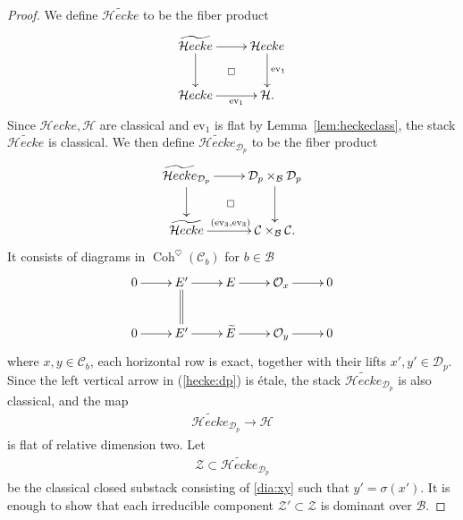 \documentclass[11pt,oneside,a4paper,mathscr]{amsart}
\makeatletter
\theoremstyle{definition}
\newcommand{\cH}{\mathcal{H}}
\newcommand{\cB}{\mathcal{B}}
\newcommand{\cC}{\mathcal{C}}
\newcommand{\cD}{\mathcal{D}}
\newcommand{\ev}{\mathrm{ev}}
\newcommand{\diasquare}{\ar@{}[rd]|\square}
\newcommand{\cHecke}{\mathcal{H}ecke}
\newcommand{\Coh}{\operatorname{Coh}}
\makeatother
\begin{document}
\begin{proof}
    We define $\widetilde{\mathcal{H}ecke}$ to be the fiber product
    \begin{align*}
    \xymatrix{
       \widetilde{\mathcal{H}ecke} \ar[r] \ar[d] \ar@{}[dr]|{\square} & \mathcal{H}ecke \ar[d]^-{\ev_1} \\
       \mathcal{H}ecke \ar[r]_-{\ev_1} & \mathcal{H}.
    }
    \end{align*}
Since $\cHecke, \cH$ are classical and $\ev_1$ is flat by Lemma~\ref{lem:heckeclass}, the stack $\widetilde{\cHecke}$ is classical. 
    We then define $\widetilde{\cHecke}_{\cD_p}$ to be the fiber product 
    \begin{align}\label{hecke:dp}
        \xymatrix{
        \widetilde{\cHecke}_{\cD_p}\ar[r] \ar[d] \diasquare & \cD_p\times_{\cB} \cD_p \ar[d] \\
        \widetilde{\cHecke} \ar[r]^{(\ev_3, \ev_3)} & \cC \times_{\cB} \cC.
        }
    \end{align}
    It consists of diagrams in $\Coh^{\heartsuit}(\cC_b)$ for $b\in \mathcal{B}$
    \begin{align}\label{dia:xy}
    \xymatrix{
    0\ar[r] & E' \ar[r] \ar@{=}[d] & E \ar[r] & \mathcal{O}_x \ar[r] & 0 \\
    0\ar[r] & E' \ar[r] & \widetilde{E} \ar[r] & \mathcal{O}_y \ar[r] & 0
    }
    \end{align}
    where $x, y \in \cC_b$, each horizontal row is exact, together with their lifts $x', y' \in \cD_p$.
    Since the left vertical arrow in (\ref{hecke:dp}) is \'etale, the stack 
    $\widetilde{\cHecke}_{\cD_p}$ is also classical, and the map 
    \begin{align*}
        \widetilde{\cHecke}_{\mathcal{D}_p} \to \cH
    \end{align*}
    is flat of relative dimension two. 
    Let
    \begin{align*}
        \mathcal{Z} \subset \widetilde{\mathcal{H}ecke}_{\cD_p}
    \end{align*}
    be the classical closed substack consisting of \eqref{dia:xy} such that $y'=\sigma(x')$. It is enough to show that each irreducible component $\mathcal{Z}' \subset \mathcal{Z}$ is dominant over $\mathcal{B}$.


\end{proof}
\end{document}
